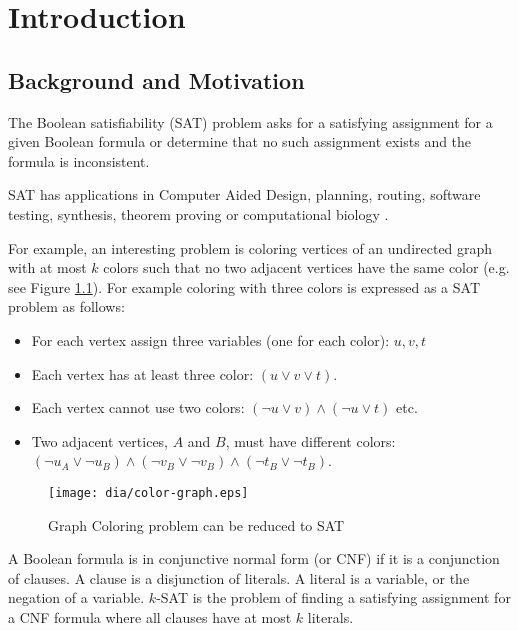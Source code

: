 \chapter{Introduction}

\section{Background and Motivation}

The Boolean satisfiability (SAT) problem asks for a satisfying
assignment for a given Boolean formula or determine
that no such assignment exists and the formula is inconsistent.

SAT has applications in Computer Aided Design,
planning, routing, software testing, synthesis, theorem
proving or computational biology \cite{Smith_diagnosis,
Soeken:2010:VUM:1870926.1871248, demoura2008z3, Corblin07asat-based,
Kautz:1992:PS:145448.146725}.

For example, an interesting problem is coloring vertices
of an undirected graph with at most $k$ colors such that no
two adjacent vertices have the same color (e.g. see Figure
\ref{fig:color-graph}). For example coloring with three colors is
expressed as a SAT problem as follows:
\begin{itemize}
  \item For each vertex assign three variables (one for each color): $u, v, t$
  \item Each vertex has at least three color: $(u \lor v \lor t)$.
  \item Each vertex cannot use two colors:
  $(\neg u \lor v) \land (\neg u \lor t)$ etc.
  \item Two adjacent vertices, $A$ and $B$, must have different colors:
  $(\neg u_A \lor \neg u_B) \land (\neg v_B \lor \neg v_B) \land (\neg t_B \lor \neg t_B)$.
\end{itemize}

\begin{figure}
  \centering
  \texttt{[image: dia/color-graph.eps]}
  \caption{Graph Coloring problem can be reduced to SAT}
  \label{fig:color-graph}
\end{figure}

A Boolean formula is in conjunctive normal form (or
CNF) if it is a conjunction of clauses. A clause is a disjunction
of literals. A literal is a variable, or the negation of a
variable. $k$-SAT is the problem of finding a satisfying assignment
for a CNF formula where all clauses have at most $k$ literals.


